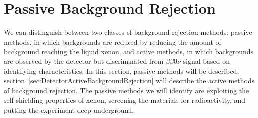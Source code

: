 \section{Passive Background Rejection}\label{sec:DetectorPassiveBackgroundRejection}

We can distinguish between two classes of background rejection methods: passive methods, in which backgrounds are reduced by reducing the amount of background reaching the liquid xenon, and active methods, in which backgrounds are observed by the detector but discriminated from $\beta\beta 0\nu$ signal based on identifying characteristics.  In this section, passive methods will be described; section~\ref{sec:DetectorActiveBackgroundRejection} will describe the active methods of background rejection.  The passive methods we will identify are exploiting the self-shielding properties of xenon, screening the materials for radioactivity, and putting the experiment deep underground.

